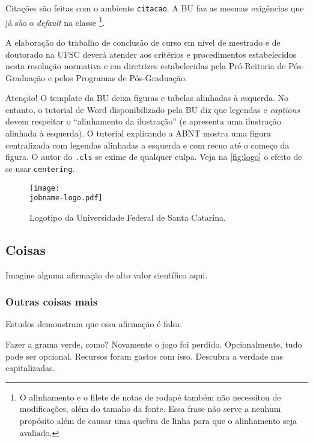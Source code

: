 \documentclass[]{ufsc-thesis-rn46-2019}
\begin{document}
Citações são feitas com o ambiente \texttt{citacao}. A BU faz
as mesmas exigências que já são o \textit{default} na classe
\abnTeX\footnote{O alinhamento e o filete de notas de rodapé também
não necessitou de modificações, além do tamaho da fonte. Essa frase
não serve a nenhum propósito além de causar uma quebra de linha para
que o alinhamento seja avaliado.}. 

\begin{citacao}
  A elaboração do trabalho de conclusão de curso em nível de mestrado
  e de doutorado na UFSC deverá atender aos critérios e procedimentos
  estabelecidos nesta resolução normativa e em diretrizes
  estabelecidas pela Pró-Reitoria de Pós-Graduação e pelos Programas
  de Pós-Graduação.
\end{citacao}

Atenção! O template da BU deixa figuras e tabelas alinhadas à esquerda. No
entanto, o tutorial de Word disponibilizado pela BU diz que legendas e
\emph{captions} devem respeitar o ``alinhamento da ilustração'' (e apresenta
uma ilustração alinhada à esquerda). O tutorial explicando a ABNT mostra uma
figura centralizada com legendas alinhadas a esquerda e com recuo até o começo
da figura. O autor do \texttt{.cls} se exime de qualquer culpa. 
Veja na \autoref{fig:logo} o efeito de se usar \texttt{centering}.

\begin{figure}[t]
  \centering
  \caption{Logotipo da Universidade Federal de Santa Catarina.}
  \label{fig:logo}

  \texttt{[image: \\jobname-logo.pdf]}
\end{figure}

\subsection{Coisas}
\label{sec:stuff}
Imagine alguma afirmação de alto valor científico aqui.

\subsubsection{Outras coisas mais}
\label{sec:other}
Estudos demonstram que essa afirmação é falsa.

\label{sec:yet-another}
Fazer a grama verde, como? Novamente o jogo foi perdido. Opcionalmente, tudo
pode ser opcional. Recursos foram gastos com isso. Descubra a verdade nas
capitalizadas.


\postextual

\end{document}
